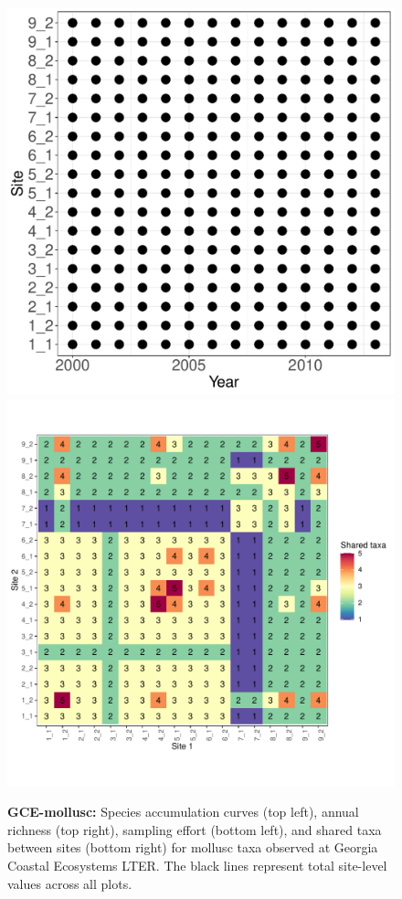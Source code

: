 \documentclass[11pt, oneside]{article}
\begin{document}
\begin{figure}[h!]
\includegraphics[scale = 0.4]{gce-mollusc-compagnoni_spatiotemporal_sampling_effort.pdf}
\includegraphics[scale = 0.4]{gce-mollusc-compagnoni_spp_shared.pdf}
\caption{{\bf GCE-mollusc:} Species accumulation curves (top left),  annual richness (top right), sampling effort (bottom left), and shared taxa between sites (bottom right) for mollusc taxa observed at Georgia Coastal Ecosystems LTER. The black lines represent total site-level values across all plots.}
\label{gce-mollusc}
\end{figure}
\end{document}
